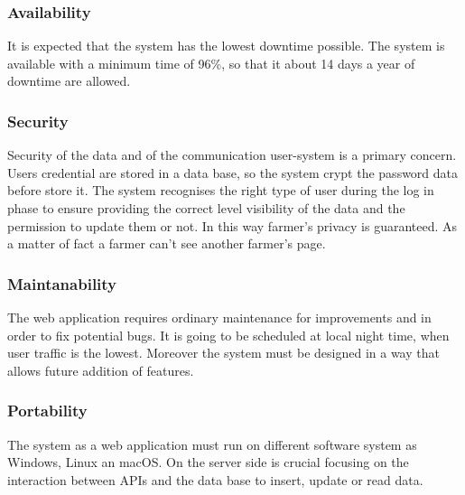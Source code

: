 \subsubsection{Availability}
It is expected that the system has the lowest downtime possible. 
The system is available with a minimum time of 96\%, 
so that it about 14 days a year of downtime are allowed.


\subsubsection{Security}
\label{subsubsection:3.4.3}
Security of the data and of the communication user-system is a primary concern. Users credential are stored in a data base, so the system crypt the password data before store it. The system recognises the right type of user during the log in phase to ensure providing the correct level visibility of the data and the permission to update them or not. In this way farmer’s privacy is guaranteed. As a matter of fact a farmer can’t see another farmer’s page.


\subsubsection{Maintanability}
The web application requires ordinary maintenance for improvements and in order to fix potential bugs. 
It is going to be scheduled at local night time, when user traffic is the lowest.
Moreover the system must be designed in a way that allows future addition of features.

\subsubsection{Portability}
The system as a web application must run on different software system as Windows, Linux an macOS.
On the server side is crucial focusing on the interaction between APIs and the data base to insert, update or read data.

